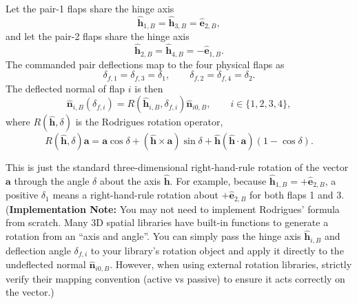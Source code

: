 Let the pair-1 flaps share the hinge axis
\begin{equation}
\hat{\mathbf h}_{1,B}=\hat{\mathbf h}_{3,B}=\hat{\mathbf e}_{2,B},
\end{equation}
and let the pair-2 flaps share the hinge axis
\begin{equation}
\hat{\mathbf h}_{2,B}=\hat{\mathbf h}_{4,B}=-\hat{\mathbf e}_{1,B}.
\end{equation}
The commanded pair deflections map to the four physical flaps as
\begin{equation}
\delta_{f,1}=\delta_{f,3}=\delta_1,
\qquad
\delta_{f,2}=\delta_{f,4}=\delta_2.
\end{equation}
The deflected normal of flap \(i\) is then
\begin{equation}
\hat{\mathbf n}_{i,B}(\delta_{f,i})
=
R(\hat{\mathbf h}_{i,B},\delta_{f,i})\hat{\mathbf n}_{i0,B},
\qquad
i\in\{1,2,3,4\}, \label{eq:flap_deflected_normal}
\end{equation}
where \(R(\hat{\mathbf h},\delta)\) is the Rodrigues rotation operator,
\begin{equation}
R(\hat{\mathbf h},\delta)\mathbf a
=
\mathbf a\cos\delta
+
(\hat{\mathbf h}\times\mathbf a)\sin\delta
+
\hat{\mathbf h}\left(\hat{\mathbf h}\cdot\mathbf a\right)(1-\cos\delta). \label{eq:rodrigues_rotation}
\end{equation}

This is just the standard three-dimensional right-hand-rule rotation of the vector \(\mathbf a\) through the angle \(\delta\) about the axis \(\hat{\mathbf h}\). For example, because \(\hat{\mathbf h}_{1,B}=+\hat{\mathbf e}_{2,B}\), a positive \(\delta_1\) means a right-hand-rule rotation about \(+\hat{\mathbf e}_{2,B}\) for both flaps 1 and 3. (\textbf{Implementation Note:} You may not need to implement Rodrigues' formula from scratch. Many 3D spatial libraries have built-in functions to generate a rotation from an ``axis and angle''. You can simply pass the hinge axis $\hat{\mathbf h}_{i,B}$ and deflection angle $\delta_{f,i}$ to your library's rotation object and apply it directly to the undeflected normal $\hat{\mathbf n}_{i0,B}$. However, when using external rotation libraries, strictly verify their mapping convention (active vs passive) to ensure it acts correctly on the vector.)

